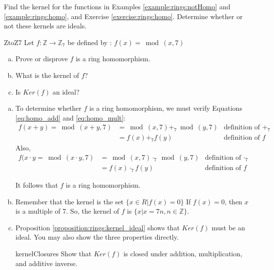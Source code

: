 \begin{exercise}{}
Find the kernel for the functions in Examples \ref{example:rings:notHomo} and \ref{example:rings:homo}, and Exercise \ref{exercise:rings:homo}.  Determine whether or not these kernels are ideals.
\end{exercise}

\begin{example}{ZtoZ7}
Let $f:{\mathbb Z}\rightarrow {\mathbb Z}_7$ be defined by : $f(x)=\bmod(x,7)$
\begin{enumerate}[(a)]
\item Prove or disprove $f$ is a ring homomorphism.
\item What is the kernel of $f$?
\item Is $Ker(f)$ an ideal?
\end{enumerate}

\begin{enumerate}[(a)]
\item To determine whether $f$ is a ring homomorphism, we must verify Equations \eqref{eq:homo_add} and \eqref{eq:homo_mult}:\\
\begin{align*}
f(x+y)=\bmod(x+y,7)&=\bmod(x,7)+_7\bmod(y,7) & \text{definition of $+_7$}\\
&=f(x)+_7 f(y) & \text{definition of $f$} 
\end{align*}
Also,
\begin{align*}
f(x\cdot y=\bmod(x\cdot y,7)&=\bmod(x,7)\cdot_7\bmod(y,7) & \text{definition of $\cdot_7$}\\
&=f(x)\cdot_7f(y) & \text{definition of $f$}
\end{align*}

It follows that $f$ is a ring homomorphism.

\item Remember that the kernel is the set $\{x\in R|f(x)=0\}$ If $f(x)=0$, then $x$ is a multiple of 7. So, the kernel of $f$ is $\{x|x=7n, n\in{\mathbb Z}\}$.

\item Proposition \ref{proposition:rings:kernel_ideal} shows that $Ker(f)$ must be an ideal.  You may also show the three properties directly.

\begin{exercise}{kernelClosures}
Show that $Ker(f)$ is closed under addition, multiplication, and additive inverse.
\end{exercise}
\end{enumerate}
\end{example}


